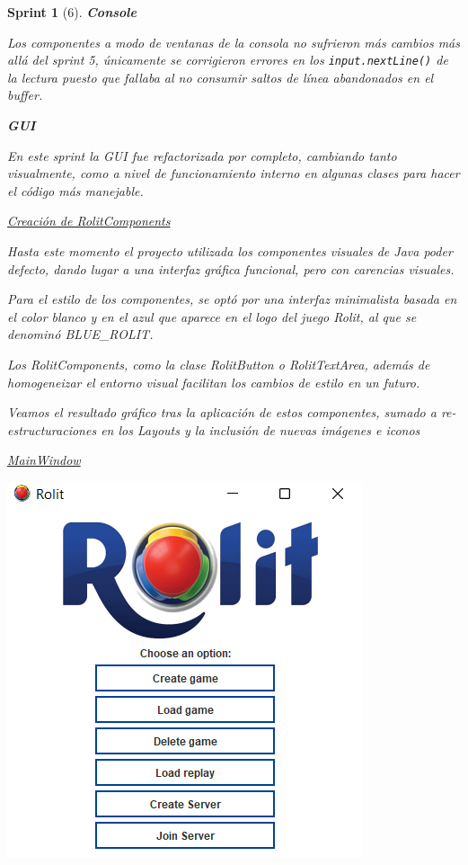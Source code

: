 \documentclass[12pt,a4paper,openright]{book}
\theoremstyle{break}
\newtheorem*{sprint}{Sprint}
\begin{document}
\begin{sprint}[6]
\textbf{Console}

Los componentes a modo de ventanas de la consola no sufrieron más cambios más allá del sprint 5, únicamente se corrigieron errores en los \texttt{input.nextLine()} de la lectura puesto que fallaba al no consumir saltos de línea abandonados en el buffer.

\textbf{GUI}

En este sprint la GUI fue refactorizada por completo, cambiando tanto visualmente, como a nivel de funcionamiento interno en algunas clases para hacer el código más manejable.

\underline{Creación de RolitComponents}

Hasta este momento el proyecto utilizada los componentes visuales de Java poder defecto, dando lugar a una interfaz gráfica funcional, pero con carencias visuales.

Para el estilo de los componentes, se optó por una interfaz minimalista basada en el color blanco y en el azul que aparece en el logo del juego Rolit, al que se denominó \textit{BLUE\_ROLIT}.

Los \textit{RolitComponents}, como la clase \textit{RolitButton} o \textit{RolitTextArea}, además de homogeneizar el entorno visual facilitan los cambios de estilo en un futuro.

Veamos el resultado gráfico tras la aplicación de estos componentes, sumado a re-estructuraciones en los Layouts y la inclusión de nuevas imágenes e iconos

\underline{MainWindow}
\begin{center}
\includegraphics[scale=1]{menu-sprint-6.png}


\end{center}
\end{sprint}
\end{document}
